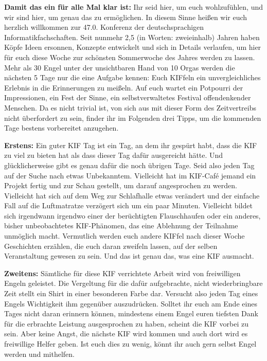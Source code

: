
\textbf{Damit das ein für alle Mal klar ist:} Ihr seid hier, um euch wohlzufühlen, und wir sind hier, um genau das zu ermöglichen.
In diesem Sinne heißen wir euch herzlich willkommen zur 47.0. Konferenz der deutschsprachigen Informatikfachschaften.
Seit nunmehr 2,5 (in Worten: zweieinhalb) Jahren haben Köpfe Ideen ersonnen, Konzepte entwickelt und sich in Details verlaufen, um hier für euch diese Woche zur schönsten Sommerwoche des Jahres werden zu lassen.
Mehr als 30 Engel unter der unsichtbaren Hand von 10 Orgas werden die nächsten 5 Tage nur die eine Aufgabe kennen: Euch KIFfeln ein unvergleichliches Erlebnis in die Erinnerungen zu meißeln.
Auf euch wartet ein Potpourri der Impressionen, ein Fest der Sinne, ein selbstverwaltetes Festival offendenkender Menschen.
Da es nicht trivial ist, von sich aus mit dieser Form des Zeitvertreibs nicht überfordert zu sein, finder ihr im Folgenden drei Tipps, um die kommenden Tage bestens vorbereitet anzugehen.

\textbf{Erstens:}
Ein guter KIF Tag ist ein Tag, an dem ihr gespürt habt, dass die KIF zu viel zu bieten hat als dass dieser Tag dafür ausgereicht hätte.
Und glücklicherweise gibt es genau dafür die noch übrigen Tage.
Seid also jeden Tag auf der Suche nach etwas Unbekanntem.
Vielleicht hat im KIF-Café jemand ein Projekt fertig und zur Schau gestellt, um darauf angesprochen zu werden.
Vielleicht hat sich auf dem Weg zur Schlafhalle etwas verändert und der einfache Fall auf die Luftmatratze verzögert sich um ein paar Minuten.
Vielleicht bildet sich irgendwann irgendwo einer der berüchtigten Flauschhaufen oder ein anderes, bisher unbeobachtetes KIF-Phänomen, das eine Ablehnung der Teilnahme unmöglich macht.
Vermutlich werden euch andere KIFfel nach dieser Woche Geschichten erzählen, die euch daran zweifeln lassen, auf der selben Veranstaltung gewesen zu sein.
Und das ist genau das, was eine KIF ausmacht.

\textbf{Zweitens:}
Sämtliche für diese KIF verrichtete Arbeit wird von freiwilligen Engeln geleistet.
Die Vergeltung für die dafür aufgebrachte, nicht wiederbringbare Zeit stellt ein Shirt in einer besonderen Farbe dar.
Versucht also jeden Tag eines Engels Wichtigkeit ihm gegenüber auszudrücken.
Solltet ihr euch am Ende eines Tages nicht daran erinnern können, mindestens einem Engel euren tiefsten Dank für die erbrachte Leistung ausgesprochen zu haben, scheint die KIF vorbei zu sein.
Aber keine Angst, die nächste KIF wird kommen und auch dort wird es freiwillige Helfer geben.
Ist euch dies zu wenig, könnt ihr auch gern selbst Engel werden und mithelfen.

